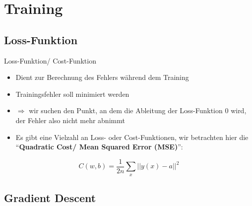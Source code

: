 \section{Training}%
\label{sec:train}

\subsection{Loss-Funktion}%
\label{sec:loss}

\begin{frame}{Loss-Funktion/ Cost-Funktion}
  \begin{itemize}
  \item Dient zur Berechnung des Fehlers während dem Training
  \item Trainingsfehler soll minimiert werden
  \item \(\Rightarrow\) wir suchen den Punkt, an dem die Ableitung der
    Loss-Funktion \(0\) wird, der Fehler also nicht mehr abnimmt
  \item Es gibt eine Vielzahl an Loss- oder Cost-Funktionen, wir betrachten hier
    die \enquote{\textbf{Quadratic Cost/ Mean Squared Error (MSE)}}:
  \end{itemize}

  \vspace{.6cm}

  \begin{minipage}{.4\linewidth}
    \[C(w, b) = \frac{1}{2n} \sum_x ||y(x) - a||^2\]
  \end{minipage}\hfill%
  \begin{minipage}{.55\linewidth}
  \end{minipage}
\end{frame}

\subsection{Gradient Descent}%
\label{sec:graddesc}

